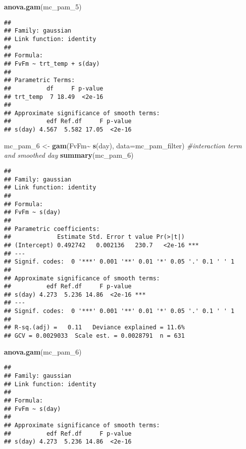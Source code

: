 \documentclass[
]{article}
\newenvironment{Shaded}{\begin{snugshade}}{\end{snugshade}}
\newcommand{\AttributeTok}[1]{\textcolor[rgb]{0.13,0.29,0.53}{#1}}
\newcommand{\CommentTok}[1]{\textcolor[rgb]{0.56,0.35,0.01}{\textit{#1}}}
\newcommand{\FunctionTok}[1]{\textcolor[rgb]{0.13,0.29,0.53}{\textbf{#1}}}
\newcommand{\NormalTok}[1]{#1}
\newcommand{\OtherTok}[1]{\textcolor[rgb]{0.56,0.35,0.01}{#1}}
\newcommand{\SpecialCharTok}[1]{\textcolor[rgb]{0.81,0.36,0.00}{\textbf{#1}}}
\begin{document}
\begin{Shaded}
\begin{Highlighting}[]
\FunctionTok{anova.gam}\NormalTok{(mc\_pam\_5)}
\end{Highlighting}
\end{Shaded}

\begin{verbatim}
## 
## Family: gaussian 
## Link function: identity 
## 
## Formula:
## FvFm ~ trt_temp + s(day)
## 
## Parametric Terms:
##          df     F p-value
## trt_temp  7 18.49  <2e-16
## 
## Approximate significance of smooth terms:
##          edf Ref.df     F p-value
## s(day) 4.567  5.582 17.05  <2e-16
\end{verbatim}

\begin{Shaded}
\begin{Highlighting}[]
\NormalTok{mc\_pam\_6 }\OtherTok{\textless{}{-}} \FunctionTok{gam}\NormalTok{(FvFm}\SpecialCharTok{\textasciitilde{}} \FunctionTok{s}\NormalTok{(day), }\AttributeTok{data=}\NormalTok{mc\_pam\_filter) }\CommentTok{\#interaction term and smoothed day}
\FunctionTok{summary}\NormalTok{(mc\_pam\_6)}
\end{Highlighting}
\end{Shaded}

\begin{verbatim}
## 
## Family: gaussian 
## Link function: identity 
## 
## Formula:
## FvFm ~ s(day)
## 
## Parametric coefficients:
##             Estimate Std. Error t value Pr(>|t|)    
## (Intercept) 0.492742   0.002136   230.7   <2e-16 ***
## ---
## Signif. codes:  0 '***' 0.001 '**' 0.01 '*' 0.05 '.' 0.1 ' ' 1
## 
## Approximate significance of smooth terms:
##          edf Ref.df     F p-value    
## s(day) 4.273  5.236 14.86  <2e-16 ***
## ---
## Signif. codes:  0 '***' 0.001 '**' 0.01 '*' 0.05 '.' 0.1 ' ' 1
## 
## R-sq.(adj) =   0.11   Deviance explained = 11.6%
## GCV = 0.0029033  Scale est. = 0.0028791  n = 631
\end{verbatim}

\begin{Shaded}
\begin{Highlighting}[]
\FunctionTok{anova.gam}\NormalTok{(mc\_pam\_6)}
\end{Highlighting}
\end{Shaded}

\begin{verbatim}
## 
## Family: gaussian 
## Link function: identity 
## 
## Formula:
## FvFm ~ s(day)
## 
## Approximate significance of smooth terms:
##          edf Ref.df     F p-value
## s(day) 4.273  5.236 14.86  <2e-16
\end{verbatim}
\end{document}
